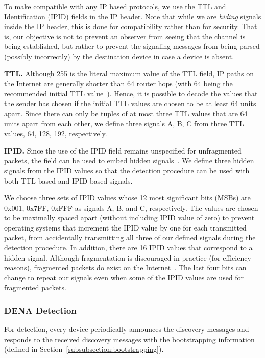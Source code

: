 To make \name compatible with any IP based protocols, we use the TTL and
Identification (IPID) fields in the IP header. Note that while we are
\textit{hiding} signals inside the IP header, this is done for compatibility
rather than for security. That is, our objective is not to prevent an observer
from seeing that the channel is being established, but rather to prevent the
signaling messages from being parsed (possibly incorrectly) by the destination
device in case a \name device is absent.

\noindent\textbf{TTL.} Although 255 is the literal maximum value of the TTL
field, IP paths on the Internet are generally shorter than 64 router hops (with
64 being the recommended initial TTL value~\cite{rfc1700}). Hence, it is
possible to decode the values that the sender has chosen if the initial TTL
values are chosen to be at least 64 units apart. Since there can only be tuples
of at most three TTL values that are 64 units apart from each other, we define
three signals A, B, C from three TTL values, 64, 128, 192, respectively.

\noindent\textbf{IPID.} Since the use of the IPID field remains unspecified for
unfragmented packets, the field can be used to embed hidden
signals~\cite{rfc6864}. We define three hidden signals from the IPID values so
that the \name detection procedure can be used with both TTL-based and
IPID-based signals.

We choose three sets of IPID values whose 12 most significant bits (MSBs) are
0x001, 0x7FF, 0xFFF as signals A, B, and C, respectively. The values are chosen
to be maximally spaced apart (without including IPID value of zero) to prevent
operating systems that increment the IPID value by one for each transmitted
packet, from accidentally transmitting all three of our defined signals during
the \name detection procedure. In addition, there are 16 IPID values that
correspond to a hidden signal. Although fragmentation is discouraged in
practice (for efficiency reasons), fragmented packets do exist on the
Internet~\cite{frag2001}. The last four bits can change to repeat our signals
even when some of the IPID values are used for fragmented packets.

\subsubsection{DENA Detection}
\label{subsubsection:detection}

For detection, every \name device periodically announces the discovery messages
and responds to the received discovery messages with the bootstrapping
information (defined in Section~\ref{subsubsection:bootstrapping}).

